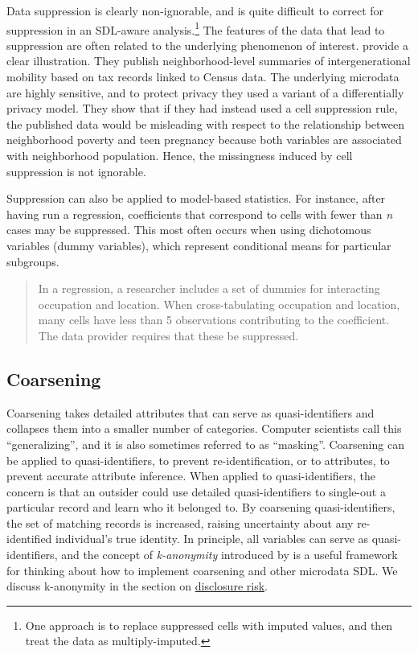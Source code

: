 \documentclass[
]{book}
\begin{document}
Data suppression is clearly non-ignorable, and is quite difficult to correct for suppression in an SDL-aware analysis.\footnote{One approach is to replace suppressed cells with imputed values, and then treat the data as multiply-imputed.} The features of the data that lead to suppression are often related to the underlying phenomenon of interest. \citet{chetty_practical_2019} provide a clear illustration. They publish neighborhood-level summaries of intergenerational mobility based on tax records linked to Census data. The underlying microdata are highly sensitive, and to protect privacy they used a variant of a differentially privacy model. They show that if they had instead used a cell suppression rule, the published data would be misleading with respect to the relationship between neighborhood poverty and teen pregnancy because both variables are associated with neighborhood population. Hence, the missingness induced by cell suppression is not ignorable.

Suppression can also be applied to model-based statistics. For instance, after having run a regression, coefficients that correspond to cells with fewer than \emph{n} cases may be suppressed. This most often occurs when using dichotomous variables (dummy variables), which represent conditional means for particular subgroups.

\begin{quote}
In a regression, a researcher includes a set of dummies for interacting occupation and location. When cross-tabulating occupation and location, many cells have less than 5 observations contributing to the coefficient. The data provider requires that these be suppressed.
\end{quote}

\hypertarget{coarsening}{%
\subsection{Coarsening}\label{coarsening}}

Coarsening takes detailed attributes that can serve as quasi-identifiers and collapses them into a smaller number of categories. Computer scientists call this ``generalizing'', and it is also sometimes referred to as ``masking''. Coarsening can be applied to quasi-identifiers, to prevent re-identification, or to attributes, to prevent accurate attribute inference. When applied to quasi-identifiers, the concern is that an outsider could use detailed quasi-identifiers to single-out a particular record and learn who it belonged to. By coarsening quasi-identifiers, the set of matching records is increased, raising uncertainty about any re-identified individual's true identity. In principle, all variables can serve as quasi-identifiers, and the concept of \emph{k-anonymity} introduced by \citet{sweeney_achieving_2002} is a useful framework for thinking about how to implement coarsening and other microdata SDL. We discuss k-anonymity in the section on \protect\hyperlink{disclosure-risk}{disclosure risk}.
\end{document}
